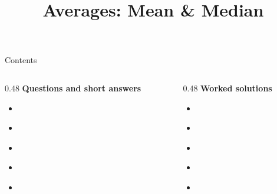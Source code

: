 \documentclass{beamer}
\title{Averages: Mean \& Median}
\author{}
\date{}
\begin{document}
\frame{\titlepage}

\begin{frame}{Contents}
\small
\begin{columns}[T]
  \begin{column}{0.48\textwidth}
    \textbf{Questions and short answers}
    \begin{itemize}
      \item \hyperlink{q-st1}{}
      \item \hyperlink{q-st2}{}
      \item \hyperlink{q-st3}{}
      \item \hyperlink{q-st4}{}
      \item \hyperlink{q-st5}{}
    \end{itemize}
  \end{column}
  \begin{column}{0.48\textwidth}
    \textbf{Worked solutions}
    \begin{itemize}
      \item \hyperlink{work-st1}{}
      \item \hyperlink{work-st2}{}
      \item \hyperlink{work-st3}{}
      \item \hyperlink{work-st4}{}
      \item \hyperlink{work-st5}{}
    \end{itemize}
  \end{column}
\end{columns}
\end{frame}
\end{document}

